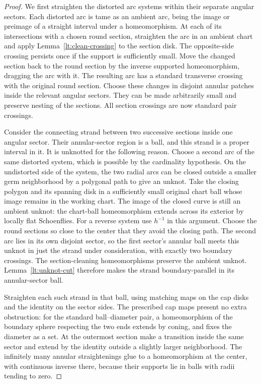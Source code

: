 \begin{proof}
We first straighten the distorted arc systems within their separate
angular sectors.  Each distorted arc is tame as an ambient arc, being
the image or preimage of a straight interval under a homeomorphism.
At each of its intersections with a chosen round section, straighten
the arc in an ambient chart and apply Lemma~\ref{lt:clean-crossing} to
the section disk.  The opposite-side crossing persists once if the
support is sufficiently small.  Move the changed section back to the
round section by the inverse supported homeomorphism, dragging the
arc with it.  The resulting arc has a standard transverse crossing
with the original round section.  Choose these changes in disjoint
annular patches inside the relevant angular sectors.  They can be
made arbitrarily small and preserve nesting of the sections.  All
section crossings are now standard pair crossings.

Consider the connecting strand between two successive sections inside
one angular sector.  Their annular-sector region is a ball, and this
strand is a proper interval in it.  It is unknotted for the following
reason.  Choose a second arc of the same distorted system, which is
possible by the cardinality hypothesis.  On the undistorted side of
the system, the two radial arcs can be closed outside a smaller germ
neighborhood by a polygonal path to give an unknot.  Take the closing
polygon and its spanning disk in a sufficiently small original chart
ball whose image remains in the working chart.  The image of the
closed curve is still an ambient unknot: the chart-ball homeomorphism
extends across its exterior by locally flat Schoenflies.  For a
reverse system use $h^{-1}$ in this argument.  Choose the round
sections so close to the center that they avoid the closing path.
The second arc lies in its own disjoint sector, so the first sector's
annular ball meets this unknot in just the strand under consideration,
with exactly two boundary crossings.  The section-cleaning
homeomorphisms preserve the ambient unknot.  Lemma~\ref{lt:unknot-cut}
therefore makes the strand boundary-parallel in its annular-sector
ball.

Straighten each such strand in that ball, using matching maps on the
cap disks and the identity on the sector sides.  The prescribed cap
maps present no extra obstruction: for the standard ball--diameter
pair, a homeomorphism of the boundary sphere respecting the two ends
extends by coning, and fixes the diameter as a set.  At the outermost
section make a transition inside the same sector and extend by the
identity outside a slightly larger neighborhood.  The infinitely
many annular straightenings glue to a homeomorphism at the center,
with continuous inverse there, because their supports lie in balls
with radii tending to zero.


\end{proof}
